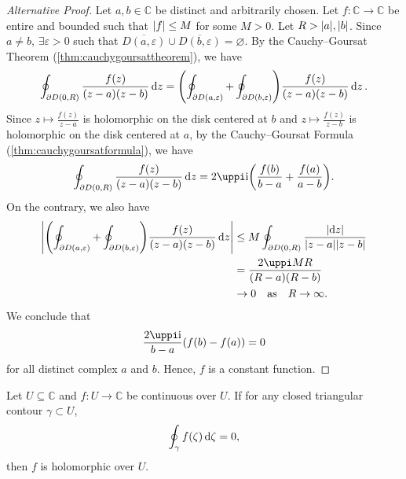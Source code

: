 \begin{proof}[Alternative Proof]
    Let \(a,b\in\mathbb{C}\) be distinct and arbitrarily chosen. Let
    \(f:\mathbb{C}\to\mathbb{C}\) be entire and bounded such that \(\abs{f}\leq M\)
    for some \(M>0\). Let \(R>\abs{a},\abs{b}\). Since \(a\neq b\),
    \(\exists\varepsilon>0\) such that
    \(\overline{D(a,\varepsilon)}\cup\overline{D(b,\varepsilon)}=\varnothing\). By
    the Cauchy--Goursat Theorem (\cref{thm:cauchygoursattheorem}), we have \[\oint_{\partial D(0,R)}\frac{f(z)}{(z-a)(z-b)}\dd{z}=\qty(\oint_{\partial D(a,\varepsilon)}+\oint_{\partial D(b,\varepsilon)})\frac{f(z)}{(z-a)(z-b)}\dd{z}.\]
    Since \(z\mapsto\frac{f(z)}{z-a}\) is holomorphic on the disk centered at \(b\) and \(z\mapsto\frac{f(z)}{z-b}\) is holomorphic on the disk centered at \(a\), by the Cauchy--Goursat Formula (\cref{thm:cauchygoursatformula}), we have \[\oint_{\partial D(0,R)}\frac{f(z)}{(z-a)(z-b)}\ddz=2\uppi\ii\qty(\frac{f(b)}{b-a}+\frac{f(a)}{a-b}).\]
    On the contrary, we also have
    \begin{align*}
        \abs{\qty(\oint_{\partial D(a,\varepsilon)}+\oint_{\partial D(b,\varepsilon)})\frac{f(z)}{(z-a)(z-b)}\ddz} & \leq M\oint_{\partial D(0,R)}\frac{\abs{\ddz}}{\abs{z-a}\abs{z-b}} \\
                                                                                                                   & =\frac{2\uppi MR}{(R-a)(R-b)}                                      \\
                                                                                                                   & \to 0\qas{R\to\infty}.
    \end{align*}
    We conclude that \[\frac{2\uppi\ii}{b-a}\qty(f(b)-f(a))=0\] for all distinct complex \(a\) and \(b\). Hence, \(f\) is a constant function.
\end{proof}
\begin{theorem}\label{thm:morera}
    Let \(U\subseteq\mathbb{C}\) and \(f:U\to\mathbb{C}\) be continuous over \(U\). If for any closed triangular contour \(\gamma\subset U\), \[\oint_{\gamma}f(\zeta)\dd{\zeta}=0,\] then \(f\) is holomorphic over \(U\).
\end{theorem}
